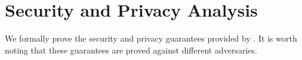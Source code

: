 \section{Security and Privacy Analysis}
\label{sec:analysis}


We formally prove the security and privacy guarantees provided by \usso.
It is worth noting that these guarantees are proved against different adversaries.









